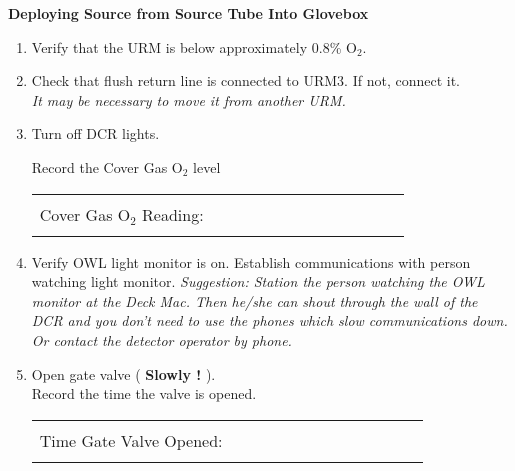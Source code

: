 \begin{center}
            {\bf Deploying Source from Source Tube Into Glovebox}
\end{center}


\begin{enumerate}

 \item\checkbox Verify that the URM is below approximately 0.8\% O$_2$.


\item\checkbox Check that flush return line is connected to
  URM3.  If not, connect it.\\
  \small
  {\em It may be necessary to move it from another URM.
  }
  \normalsize
  

 \item\checkbox Turn off DCR lights.


 \checkitem Record the Cover Gas O$_2$ level
     \begin{center}
     \begin{tabular}{|l|}
     \hline
      \\
     Cover Gas O$_2$ Reading:~~~~~~~~~~~~~~~~~~~~~~~~\\
      \\
     \hline
     \end{tabular}
     \end{center}

 \item\checkbox Verify OWL light monitor is on.  Establish communications
  with person watching light monitor.
  \small
  {\em
    Suggestion:  Station the person watching the OWL monitor at
    the Deck Mac.  Then he/she can shout through the  wall of the
    DCR and you don't need to use the phones which slow communications
    down. Or contact the detector operator by phone.
  }
  \normalsize
 

\item\checkbox Open gate valve ( {\bf Slowly !} ).\\
  Record the time the valve is opened.
     \begin{center}
     \begin{tabular}{|l|}
     \hline
      \\
     Time Gate Valve Opened:~~~~~~~~~~~~~~~~~~~~~~~~\\
      \\
     \hline
     \end{tabular}
     \end{center}


\end{enumerate}
